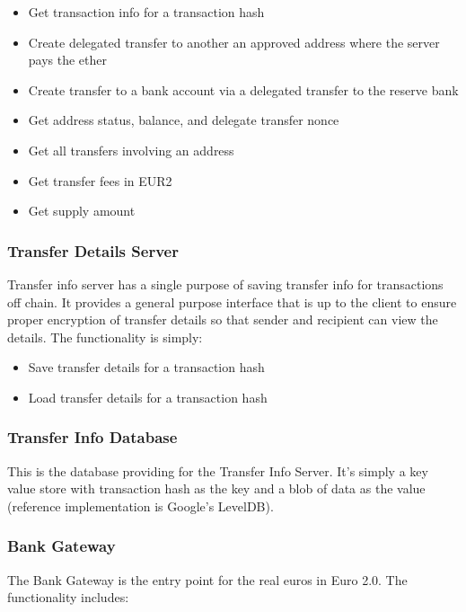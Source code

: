 \documentclass[a4paper,12pt]{article} %
\begin{document}
{\begin{itemize}
	\item Get transaction info for a transaction hash
	\item Create delegated transfer to another an approved address where the server pays the ether
	\item Create transfer to a bank account via a delegated transfer to the reserve bank
	\item Get address status, balance, and delegate transfer nonce
	\item Get all transfers involving an address
	\item Get transfer fees in EUR2
	\item Get supply amount
\end{itemize}

\subsubsection{Transfer Details Server} \label{sssec:3.5:transferDetailsServer}

Transfer info server has a single purpose of saving transfer info for transactions off chain. It provides a general purpose interface that is up to the client to ensure proper encryption of transfer details so that sender and recipient can view the details. The functionality is simply:

\begin{itemize}
	\item Save transfer details for a transaction hash
	\item Load transfer details for a transaction hash
\end{itemize}

\subsubsection{Transfer Info Database} \label{sssec:3.5:transferInfoDatabase}

This is the database providing for the Transfer Info Server. It's simply a key value store with transaction hash as the key and a blob of data as the value (reference implementation is Google's LevelDB).

\subsubsection{Bank Gateway} \label{sssec:3.5:bankGateway}

The Bank Gateway is the entry point for the real euros in Euro 2.0. The functionality includes:

}
\end{document}
